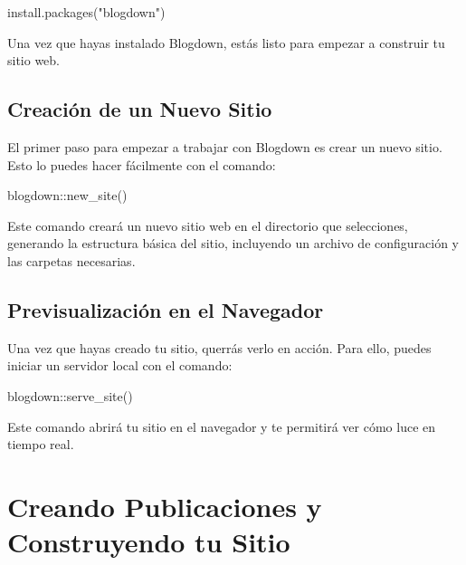 \documentclass[
  doc,
  floatsintext,
  longtable,
  a4paper,
  nolmodern,
  notxfonts,
  notimes,
  colorlinks=true,linkcolor=blue,citecolor=blue,urlcolor=blue]{apa7}
\newenvironment{Shaded}{\begin{snugshade}}{\end{snugshade}}
\newcommand{\FunctionTok}[1]{\textcolor[rgb]{0.28,0.35,0.67}{#1}}
\newcommand{\NormalTok}[1]{\textcolor[rgb]{0.00,0.23,0.31}{#1}}
\newcommand{\SpecialCharTok}[1]{\textcolor[rgb]{0.37,0.37,0.37}{#1}}
\newcommand{\StringTok}[1]{\textcolor[rgb]{0.13,0.47,0.30}{#1}}
\begin{document}
\begin{Shaded}
\begin{Highlighting}[]
\FunctionTok{install.packages}\NormalTok{(}\StringTok{"blogdown"}\NormalTok{)}
\end{Highlighting}
\end{Shaded}

Una vez que hayas instalado Blogdown, estás listo para empezar a
construir tu sitio web.

\subsection{Creación de un Nuevo
Sitio}\label{creaciuxf3n-de-un-nuevo-sitio}

El primer paso para empezar a trabajar con Blogdown es crear un nuevo
sitio. Esto lo puedes hacer fácilmente con el comando:

\begin{Shaded}
\begin{Highlighting}[]
\NormalTok{blogdown}\SpecialCharTok{::}\FunctionTok{new\_site}\NormalTok{()}
\end{Highlighting}
\end{Shaded}

Este comando creará un nuevo sitio web en el directorio que selecciones,
generando la estructura básica del sitio, incluyendo un archivo de
configuración y las carpetas necesarias.

\subsection{Previsualización en el
Navegador}\label{previsualizaciuxf3n-en-el-navegador}

Una vez que hayas creado tu sitio, querrás verlo en acción. Para ello,
puedes iniciar un servidor local con el comando:

\begin{Shaded}
\begin{Highlighting}[]
\NormalTok{blogdown}\SpecialCharTok{::}\FunctionTok{serve\_site}\NormalTok{()}
\end{Highlighting}
\end{Shaded}

Este comando abrirá tu sitio en el navegador y te permitirá ver cómo
luce en tiempo real.

\section{Creando Publicaciones y Construyendo tu
Sitio}\label{creando-publicaciones-y-construyendo-tu-sitio}
\end{document}
